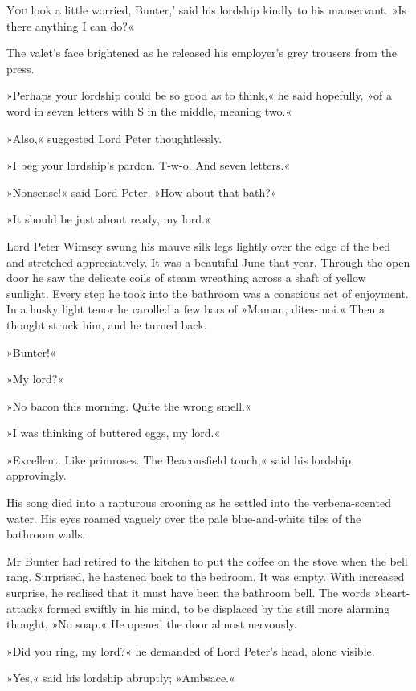 
\lettrine[lines=4,ante=‘]{Y}{ou} look a little worried, Bunter,' said his lordship kindly to his manservant. »Is there anything I can do?«

\zz
The valet's face brightened as he released his employer's grey trousers from the press.

»Perhaps your lordship could be so good as to think,« he said hopefully, »of a word in seven letters with S in the middle, meaning two.«

»Also,« suggested Lord Peter thoughtlessly.

»I beg your lordship's pardon. T-w-o. And seven letters.«

»Nonsense!« said Lord Peter. »How about that bath?«

»It should be just about ready, my lord.«

Lord Peter Wimsey swung his mauve silk legs lightly over the edge of the bed and stretched appreciatively. It was a beautiful June that year. Through the open door he saw the delicate coils of steam wreathing across a shaft of yellow sunlight. Every step he took into the bathroom was a conscious act of enjoyment. In a husky light tenor he carolled a few bars of »Maman, dites-moi.« Then a thought struck him, and he turned back.

»Bunter!«

»My lord?«

»No bacon this morning. Quite the wrong smell.«

»I was thinking of buttered eggs, my lord.«

»Excellent. Like primroses. The Beaconsfield touch,« said his lordship approvingly.

His song died into a rapturous crooning as he settled into the verbena-scented water. His eyes roamed vaguely over the pale blue-and-white tiles of the bathroom walls.

Mr Bunter had retired to the kitchen to put the coffee on the stove when the bell rang. Surprised, he hastened back to the bedroom. It was empty. With increased surprise, he realised that it must have been the bathroom bell. The words »heart-attack« formed swiftly in his mind, to be displaced by the still more alarming thought, »No soap.« He opened the door almost nervously.

»Did you ring, my lord?« he demanded of Lord Peter's head, alone visible.

»Yes,« said his lordship abruptly; »Ambsace.«

